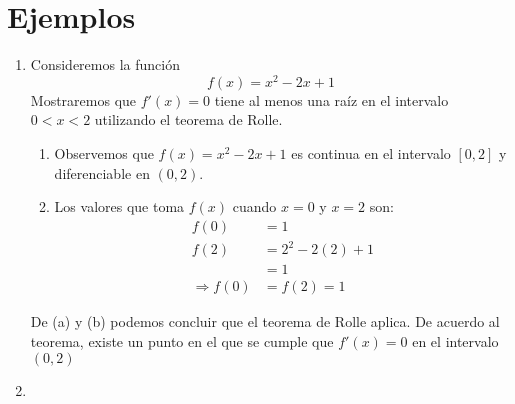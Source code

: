 \documentclass[letter]{article}
\begin{document}
\section{Ejemplos}
\begin{enumerate}

    \item %
    
    Consideremos la función 
    $$f(x)=x^{2}-2x+1$$
    Mostraremos que $f'(x)=0$ tiene al menos una raíz en el intervalo $0<x<2$ utilizando el teorema de Rolle.
    \begin{enumerate}
        \item Observemos que $f(x)=x^{2}-2x+1$ es continua en el intervalo $[0,2]$ y diferenciable en $(0,2)$. 
        \item Los valores que toma $f(x)$ cuando $x=0$ y $x=2$ son:
    \begin{equation*}
        \begin{split}
            f(0) &= 1\\
            f(2) &= 2^{2}-2(2)+1\\
            &= 1\\
            \Rightarrow f(0) &= f(2) = 1
        \end{split}
    \end{equation*}
    \end{enumerate}
    De (a) y (b) podemos concluir que el teorema de Rolle aplica. De acuerdo al teorema, existe un punto en el que se cumple que $f'(x)=0$ en el intervalo $(0,2)$
    
    \item %
    

\end{enumerate}
\end{document}
